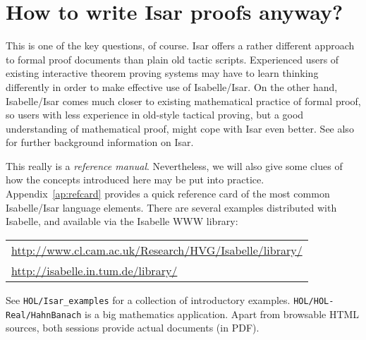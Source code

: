 \section{How to write Isar proofs anyway?}

This is one of the key questions, of course.  Isar offers a rather different
approach to formal proof documents than plain old tactic scripts.  Experienced
users of existing interactive theorem proving systems may have to learn
thinking differently in order to make effective use of Isabelle/Isar.  On the
other hand, Isabelle/Isar comes much closer to existing mathematical practice
of formal proof, so users with less experience in old-style tactical proving,
but a good understanding of mathematical proof, might cope with Isar even
better.  See also \cite{Wenzel:1999:TPHOL} for further background information
on Isar.

\medskip This really is a \emph{reference manual}.  Nevertheless, we will also
give some clues of how the concepts introduced here may be put into practice.
Appendix~\ref{ap:refcard} provides a quick reference card of the most common
Isabelle/Isar language elements.  There are several examples distributed with
Isabelle, and available via the Isabelle WWW library:
\begin{center}\small
  \begin{tabular}{l}
    \url{http://www.cl.cam.ac.uk/Research/HVG/Isabelle/library/} \\
    \url{http://isabelle.in.tum.de/library/} \\
  \end{tabular}
\end{center}

See \texttt{HOL/Isar_examples} for a collection of introductory examples.
\texttt{HOL/HOL-Real/HahnBanach} is a big mathematics application.  Apart from
browsable HTML sources, both sessions provide actual documents (in PDF).

